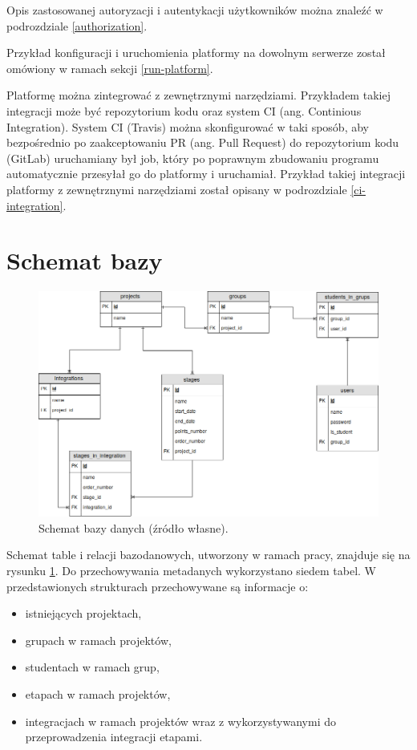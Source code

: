 Opis zastosowanej autoryzacji i autentykacji użytkowników można znaleźć w podrozdziale \ref{authorization}.

Przykład konfiguracji i uruchomienia platformy na dowolnym serwerze został omówiony w ramach sekcji \ref{run-platform}.

Platformę można zintegrować z zewnętrznymi narzędziami.
Przykładem takiej integracji może być repozytorium kodu oraz system CI (ang. Continious Integration).
System CI (Travis) można skonfigurować w taki sposób, aby bezpośrednio po zaakceptowaniu PR (ang. Pull Request) do repozytorium kodu (GitLab) uruchamiany był job, który po poprawnym zbudowaniu programu automatycznie przesyłał go do platformy i uruchamiał.
Przykład takiej integracji platformy z zewnętrznymi narzędziami został opisany w podrozdziale \ref{ci-integration}.

\section{Schemat bazy}
\label{database}

\begin{figure}[h]
    \centering
    \includegraphics[width = 13cm]{chapter02/db_schema.png}
    \caption{Schemat bazy danych (źródło własne).}
    \label{fig:platform-db-schema}
\end{figure}

Schemat table i relacji bazodanowych, utworzony w ramach pracy, znajduje się na rysunku \ref{fig:platform-db-schema}.
Do przechowywania metadanych wykorzystano siedem tabel.
W przedstawionych strukturach przechowywane są informacje o:
\begin{itemize}
    \item istniejących projektach,
    \item grupach w ramach projektów,
    \item studentach w ramach grup,
    \item etapach w ramach projektów,
    \item integracjach w ramach projektów wraz z wykorzystywanymi do przeprowadzenia integracji etapami.
\end{itemize}

